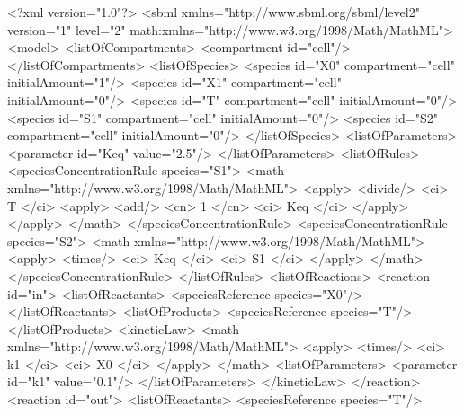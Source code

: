 \documentclass[10pt,twocolumntoc]{cekarticle}
\begin{document}
\begin{example}
<?xml version="1.0"?>
<sbml xmlns="http://www.sbml.org/sbml/level2" version="1" level="2"
      math:xmlns="http://www.w3.org/1998/Math/MathML">
    <model>
        <listOfCompartments>
            <compartment id="cell"/>
        </listOfCompartments>
        <listOfSpecies>
            <species id="X0" compartment="cell" initialAmount="1"/>
            <species id="X1" compartment="cell" initialAmount="0"/>
            <species id="T" compartment="cell" initialAmount="0"/>
            <species id="S1" compartment="cell" initialAmount="0"/>
            <species id="S2" compartment="cell" initialAmount="0"/>
        </listOfSpecies>
        <listOfParameters>
            <parameter id="Keq" value="2.5"/>
        </listOfParameters>
        <listOfRules>
            <speciesConcentrationRule species="S1">
                <math xmlns="http://www.w3.org/1998/Math/MathML">
                    <apply>
                        <divide/>
                        <ci> T </ci>
                        <apply>
                            <add/>
                            <cn> 1 </cn>
                            <ci> Keq </ci>
                        </apply>
                    </apply>
                </math>
            </speciesConcentrationRule>
            <speciesConcentrationRule species="S2">
                <math xmlns="http://www.w3.org/1998/Math/MathML">
                    <apply>
                        <times/>
                        <ci> Keq </ci>
                        <ci> S1 </ci>
                    </apply>
                </math>
            </speciesConcentrationRule>
        </listOfRules>
        <listOfReactions>
            <reaction id="in">
                <listOfReactants>
                    <speciesReference species="X0"/>
                </listOfReactants>
                <listOfProducts>
                    <speciesReference species="T"/>
                </listOfProducts>
                <kineticLaw>
                    <math xmlns="http://www.w3.org/1998/Math/MathML">
                        <apply>
                            <times/>
                            <ci> k1 </ci>
                            <ci> X0 </ci>
                        </apply>
                    </math>
                    <listOfParameters>
                        <parameter id="k1" value="0.1"/>
                    </listOfParameters>
                </kineticLaw>
            </reaction>
            <reaction id="out">
                <listOfReactants>
                    <speciesReference species="T"/>

\end{example}
\end{document}
